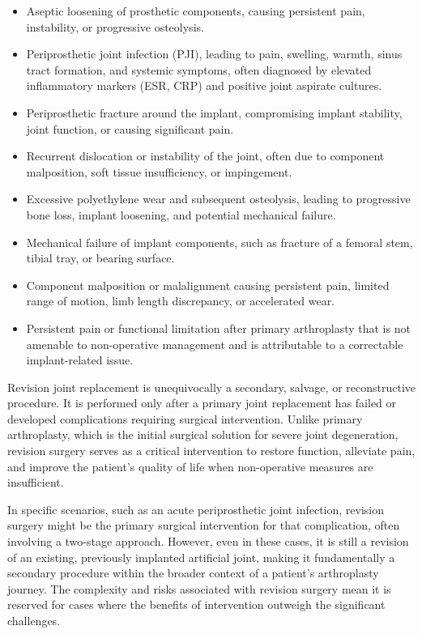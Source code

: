 \begin{itemize}
  \item Aseptic loosening of prosthetic components, causing persistent pain, instability, or progressive osteolysis.
  \item Periprosthetic joint infection (PJI), leading to pain, swelling, warmth, sinus tract formation, and systemic symptoms, often diagnosed by elevated inflammatory markers (ESR, CRP) and positive joint aspirate cultures.
  \item Periprosthetic fracture around the implant, compromising implant stability, joint function, or causing significant pain.
  \item Recurrent dislocation or instability of the joint, often due to component malposition, soft tissue insufficiency, or impingement.
  \item Excessive polyethylene wear and subsequent osteolysis, leading to progressive bone loss, implant loosening, and potential mechanical failure.
  \item Mechanical failure of implant components, such as fracture of a femoral stem, tibial tray, or bearing surface.
  \item Component malposition or malalignment causing persistent pain, limited range of motion, limb length discrepancy, or accelerated wear.
  \item Persistent pain or functional limitation after primary arthroplasty that is not amenable to non-operative management and is attributable to a correctable implant-related issue.
\end{itemize}

Revision joint replacement is unequivocally a secondary, salvage, or reconstructive procedure. It is performed only after a primary joint replacement has failed or developed complications requiring surgical intervention. Unlike primary arthroplasty, which is the initial surgical solution for severe joint degeneration, revision surgery serves as a critical intervention to restore function, alleviate pain, and improve the patient's quality of life when non-operative measures are insufficient.

In specific scenarios, such as an acute periprosthetic joint infection, revision surgery might be the primary surgical intervention for that complication, often involving a two-stage approach. However, even in these cases, it is still a revision of an existing, previously implanted artificial joint, making it fundamentally a secondary procedure within the broader context of a patient's arthroplasty journey. The complexity and risks associated with revision surgery mean it is reserved for cases where the benefits of intervention outweigh the significant challenges.


